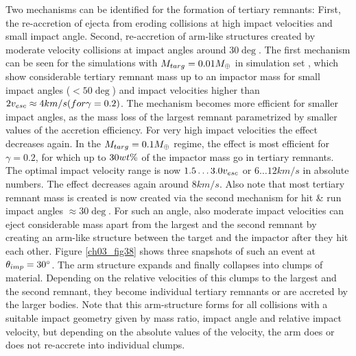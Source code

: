 Two mechanisms can be identified for the formation of tertiary remnants: First, the re-accretion of ejecta from eroding collisions at high impact velocities and small impact angle. Second, re-accretion of arm-like structures created by moderate velocity collisions at impact angles around $30 \deg$. The first mechanism can be seen for the simulations with $M_{targ} = 0.01 M_{\oplus}$ in simulation set \css, which show considerable tertiary remnant mass up to an impactor mass for small impact angles ($< 50 \deg$) and impact velocities higher than $2 v_{esc} \approx 4 km/s (for \gamma = 0.2)$. The mechanism becomes more efficient for smaller impact angles, as the mass loss of the largest remnant parametrized by smaller values of the accretion efficiency. For very high impact velocities the effect decreases again. In the $M_{targ} = 0.1 M_{\oplus}$ regime, the effect is most efficient for $\gamma = 0.2$, for which up to $30wt\mathrm{\%}$ of the impactor mass go in tertiary remnants. The optimal impact velocity range is now $1.5 \dots 3.0 v_{esc}$ or $6 \dots 12 km/s$ in absolute numbers. The effect decreases again around $8 km/s$. Also note that most tertiary remnant mass is created is now created via the second mechanism for hit \& run impact angles $\approx 30 \deg$. For such an angle, also moderate impact velocities can eject considerable mass apart from the largest and the second remnant by creating an arm-like structure between the target and the impactor after they hit each other. Figure \ref{ch03_fig38} shows three snapshots of such an event at $\theta_{imp} = 30 ^\circ$. The arm structure expands and finally collapses into clumps of material. Depending on the relative velocities of this clumps to the largest and the second remnant, they become individual tertiary remnants or are accreted by the larger bodies. Note that this arm-structure forms for all collisions with a suitable impact geometry given by mass ratio, impact angle and relative impact velocity, but depending on the absolute values of the velocity, the arm does or does not re-accrete into individual clumps.

